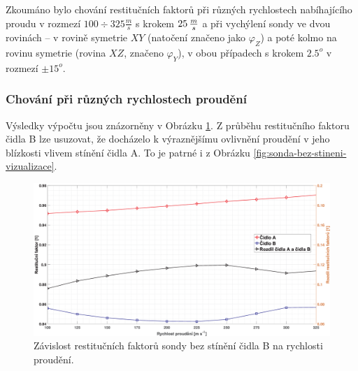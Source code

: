         Zkoumáno bylo chování restitučních faktorů při různých rychlostech nabíhajícího proudu v rozmezí $100 \div 325 \unit{\frac{m}{s}}$ s krokem $25 \, \frac{m}{s}$ a při vychýlení sondy ve dvou rovinách – v rovině symetrie $XY$ (natočení značeno jako $\varphi _Z$) a poté kolmo na rovinu symetrie (rovina $XZ$, značeno $\varphi _Y$), v obou případech s krokem $2.5^o$ v rozmezí $\pm 15^o$.
        
        \newpage
        \subsubsection{Chování při různých rychlostech proudění}
            Výsledky výpočtu jsou znázorněny v Obrázku \ref{fig:sonda-bez-stineni-rychlosti}. Z průběhu restitučního faktoru čidla B lze usuzovat, že docházelo k výraznějšímu ovlivnění proudění v jeho blízkosti vlivem stínění čidla A. To je patrné i z Obrázku \ref{fig:sonda-bez-stineni-vizualizace}. 
            
            \begin{figure}[ht!]
                \centering
                \includegraphics*[width=\textwidth]{400_SIMULACE_KONSTRUKCNICH_UPRAV/Grafy/01_rychlosti.eps}
                \caption{Závislost restitučních faktorů sondy bez stínění čidla B na rychlosti proudění.}
                \label{fig:sonda-bez-stineni-rychlosti}
            \end{figure}

